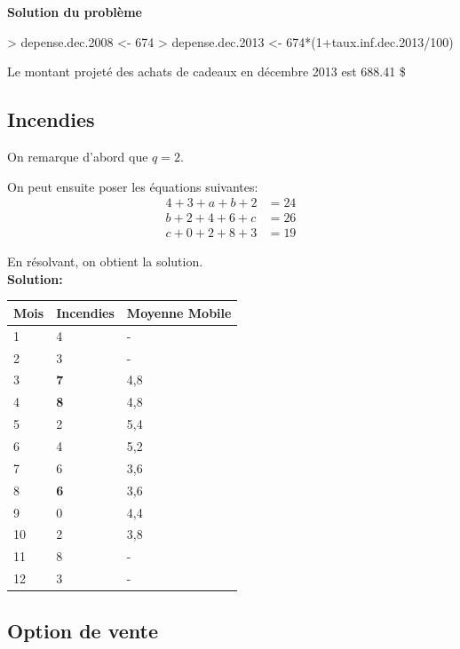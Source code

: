 \documentclass{article}
\begin{document}
\textbf{Solution du problème}
\begin{Schunk}
\begin{Sinput}
> depense.dec.2008 <- 674
> depense.dec.2013 <- 674*(1+taux.inf.dec.2013/100)
\end{Sinput}
\end{Schunk}
Le montant projeté des achats de cadeaux en décembre 2013 est 688.41 \$

\clearpage 
\subsection{Incendies}

On remarque d'abord que $q=2$.

On peut ensuite poser les équations suivantes:
\begin{align}
  \label{eq:1}
  4+3+a+b+2 &= 24\\
  b+2+4+6+c &= 26\\
  c+0+2+8+3 &= 19
\end{align}

En résolvant, on obtient la solution.\\

\textbf{Solution:}\\

\begin{tabular}{|l|l|l|}
\hline
\multicolumn{1}{|l|}{Mois} & \multicolumn{1}{l|}{Incendies} & \multicolumn{1}{l|}{Moyenne Mobile} \\ \hline
1 & 4 & \multicolumn{1}{l|}{-} \\ \hline
2 & 3 & \multicolumn{1}{l|}{-} \\ \hline
3 & \textbf{7} & 4,8 \\ \hline
4 & \textbf{8} & 4,8 \\ \hline
5 & 2 & 5,4 \\ \hline
6 & 4 & 5,2 \\ \hline
7 & 6 & 3,6 \\ \hline
8 & \textbf{6} & 3,6 \\ \hline
9 & 0  & 4,4 \\ \hline
10 & 2 & 3,8 \\ \hline
11 & 8 & \multicolumn{1}{l|}{-} \\ \hline
12 & 3 & \multicolumn{1}{l|}{-} \\ \hline
\end{tabular}

\clearpage

\subsection{Option de vente}
\end{document}
